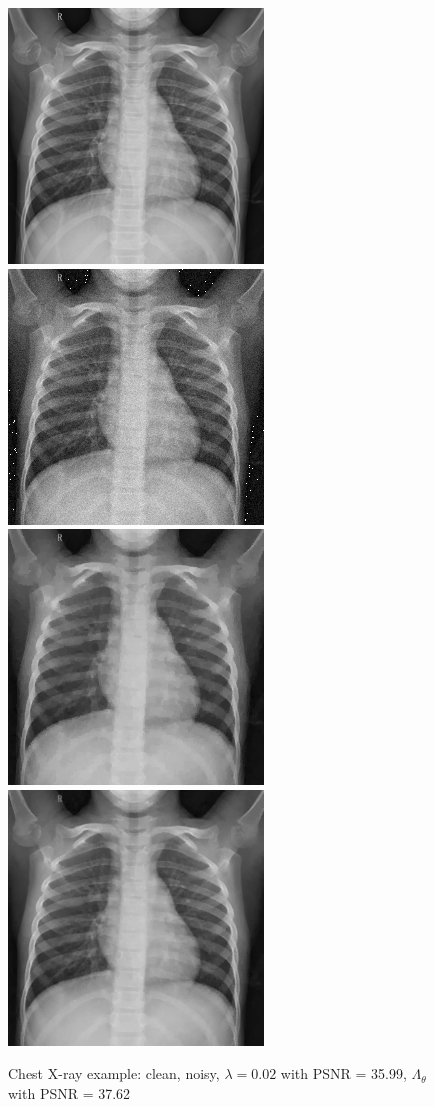\documentclass[12pt]{article}
\begin{document}



\begin{figure}[h]
  \centering
  \includegraphics[width=0.34\linewidth]{images//chest_xray/100-clean.png}
  \includegraphics[width=0.34\linewidth]{images//chest_xray/100-noisy.png}
  \includegraphics[width=0.34\linewidth]{images//chest_xray/100-psnr_35.99-lambda_0.02.png}
  \includegraphics[width=0.34\linewidth]{images//chest_xray/100-lambda_map-psnr_37.26-ssim_0.95.png}
  \caption{Chest X-ray example: clean, noisy, $\lambda = 0.02$ with PSNR = 35.99, $\Lambda_\theta$ with PSNR = 37.62}
  \label{fig:enter-label}
\end{figure}
\end{document}
